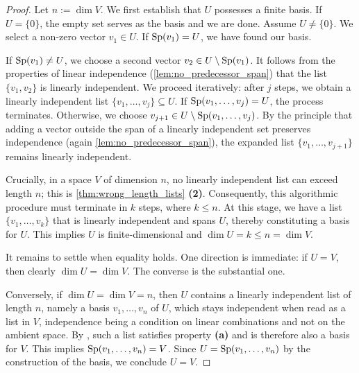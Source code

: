 \begin{proof}
Let $n := \dim V$. We first establish that $U$ possesses a finite basis. If $U = \{0\}$, the empty set serves as the basis and we are done. Assume $U \neq \{0\}$. We select a non-zero vector $v_1 \in U$. If $\operatorname{Sp}(v_1) = U$, we have found our basis. 

If $\operatorname{Sp}(v_1) \neq U$, we choose a second vector $v_2 \in U \setminus \operatorname{Sp}(v_1)$. It follows from the properties of linear independence (\cref{lem:no_predecessor_span}) that the list $\{v_1, v_2\}$ is linearly independent. We proceed iteratively: after $j$ steps, we obtain a linearly independent list $\{v_1, \dots, v_j\} \subseteq U$. If $\operatorname{Sp}(v_1, \dots, v_j) = U$, the process terminates. Otherwise, we choose $v_{j+1} \in U \setminus \operatorname{Sp}(v_1, \dots, v_j)$. By the principle that adding a vector outside the span of a linearly independent set preserves independence (again \cref{lem:no_predecessor_span}), the expanded list $\{v_1, \dots, v_{j+1}\}$ remains linearly independent.

Crucially, in a space $V$ of dimension $n$, no linearly independent list can exceed length $n$; this is \cref{thm:wrong_length_lists} \textbf{(2)}. Consequently, this algorithmic procedure must terminate in $k$ steps, where $k \le n$. At this stage, we have a list $\{v_1, \dots, v_k\}$ that is linearly independent and spans $U$, thereby constituting a basis for $U$. This implies $U$ is finite-dimensional and $\dim U = k \le n = \dim V$.

It remains to settle when equality holds. One direction is immediate: if $U = V$, then clearly $\dim U = \dim V$. The converse is the substantial one.

Conversely, if $\dim U = \dim V = n$, then $U$ contains a linearly independent list of length $n$, namely a basis $v_1, \dots, v_n$ of $U$, which stays independent when read as a list in $V$, independence being a condition on linear combinations and not on the ambient space. By , such a list satisfies property \textbf{(a)} and is therefore also a basis for $V$. This implies $\operatorname{Sp}(v_1, \dots, v_n) = V$. Since $U = \operatorname{Sp}(v_1, \dots, v_n)$ by the construction of the basis, we conclude $U = V$.
\end{proof}

